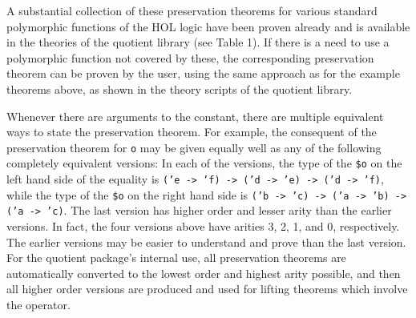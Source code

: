 \documentclass[envcountsame,runningheads]{llncs}
\begin{document}
A substantial collection of these
preservation
theorems for various
standard polymorphic functions of the HOL logic have been proven already and
is available in the theories of the quotient library (see Table 1).
If there is a need to use a
polymorphic function not covered by these, the corresponding
preservation
theorem can be proven by the user, using the same approach as for the example
theorems above, as shown in the theory scripts of the quotient library.

Whenever there are arguments to the constant, there are
multiple equivalent ways to state the
preservation
theorem.
For example, the consequent of the
preservation
theorem for {\tt o}
may be given
equally well as any of the following completely equivalent versions:
In each of the versions, the type of the {\tt \$o} on the left hand side
of the equality
is {\tt ('e -> 'f) -> ('d -> 'e) -> ('d -> 'f)},
while the type of the {\tt \$o} on the right hand side
is {\tt ('b -> 'c) -> ('a -> 'b) -> ('a -> 'c)}.
The last version has higher order and lesser arity than the
earlier versions.  In fact, the four versions above have arities
3, 2, 1, and 0, respectively.
The earlier versions may be easier to understand and prove than the
last version.
For the quotient package's internal use, all preservation
theorems are automatically converted to the lowest order and highest
arity possible, and then all higher order versions are produced
and used for lifting theorems
which involve the operator.

\vfill
\end{document}
